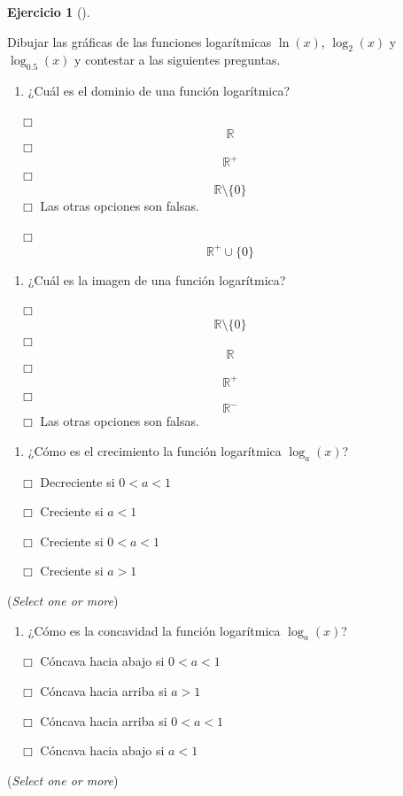 \documentclass[
  a4paper,
]{scrreport}
\providecommand{\tightlist}{%
  \setlength{\itemsep}{0pt}\setlength{\parskip}{0pt}}\usepackage{longtable,booktabs,array}
\theoremstyle{definition}
\newtheorem{exercise}{Ejercicio}[chapter]
\theoremstyle{remark}
\begin{document}
\leavevmode{}%
\begin{exercise}[]\label{exr-funciones-logaritmicas}

Dibujar las gráficas de las funciones logarítmicas \(\ln(x)\),
\(\log_2(x)\) y \(\log_{0.5}(x)\) y contestar a las siguientes
preguntas.

\begin{enumerate}
\def\labelenumi{\alph{enumi}.}
\tightlist
\item
  ¿Cuál es el dominio de una función logarítmica?
\end{enumerate}

${\quad\Box}$ $$\mathbb{R}$$
${\quad\Box}$ $$\mathbb{R}^+$$
${\quad\Box}$ $$\mathbb{R}\setminus\{0\}$$
${\quad\Box}$ Las otras opciones son falsas.

${\quad\Box}$ $$\mathbb{R}^+\cup \{0\}$$

\begin{enumerate}
\def\labelenumi{\alph{enumi}.}
\setcounter{enumi}{1}
\tightlist
\item
  ¿Cuál es la imagen de una función logarítmica?
\end{enumerate}

${\quad\Box}$ $$\mathbb{R}\setminus\{0\}$$
${\quad\Box}$ $$\mathbb{R}$$
${\quad\Box}$ $$\mathbb{R}^+$$
${\quad\Box}$ $$\mathbb{R}^-$$
${\quad\Box}$ Las otras opciones son falsas.

\begin{enumerate}
\def\labelenumi{\alph{enumi}.}
\setcounter{enumi}{2}
\tightlist
\item
  ¿Cómo es el crecimiento la función logarítmica \(\log_a(x)\)?
\end{enumerate}

${\quad\Box}$ Decreciente si $0 < a <1$

${\quad\Box}$ Creciente si $a<1$

${\quad\Box}$ Creciente si $0 < a < 1$

${\quad\Box}$ Creciente si $a>1$

(\emph{Select one or more})

\begin{enumerate}
\def\labelenumi{\alph{enumi}.}
\setcounter{enumi}{3}
\tightlist
\item
  ¿Cómo es la concavidad la función logarítmica \(\log_a(x)\)?
\end{enumerate}

${\quad\Box}$ Cóncava hacia abajo si $0 < a < 1$

${\quad\Box}$ Cóncava hacia arriba si $a>1$

${\quad\Box}$ Cóncava hacia arriba si $0 < a < 1$

${\quad\Box}$ Cóncava hacia abajo si $a<1$

(\emph{Select one or more})

\end{exercise}
\end{document}
